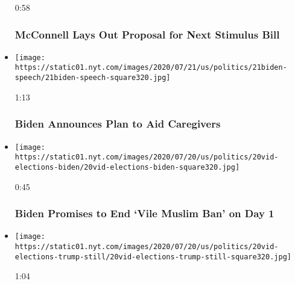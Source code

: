 \begin{itemize}
  0:58

  \hypertarget{mcconnell-lays-out-proposal-for-next-stimulus-bill}{%
  \subsubsection{McConnell Lays Out Proposal for Next Stimulus
  Bill}\label{mcconnell-lays-out-proposal-for-next-stimulus-bill}}
\item
  \href{https://www.nytimes.com/video/us/100000007249436/biden-announces-plan-to-aid-caregivers.html?action=click\&module=video-series-bar\&region=header\&pgtype=Article\&playlistId=video/us-politics}{}

  \texttt{[image: https://static01.nyt.com/images/2020/07/21/us/politics/21biden-speech/21biden-speech-square320.jpg]}

  1:13

  \hypertarget{biden-announces-plan-to-aid-caregivers}{%
  \subsubsection{Biden Announces Plan to Aid
  Caregivers}\label{biden-announces-plan-to-aid-caregivers}}
\item
  \href{https://www.nytimes.com/video/us/100000007248132/biden-muslim-voters.html?action=click\&module=video-series-bar\&region=header\&pgtype=Article\&playlistId=video/us-politics}{}

  \texttt{[image: https://static01.nyt.com/images/2020/07/20/us/politics/20vid-elections-biden/20vid-elections-biden-square320.jpg]}

  0:45

  \hypertarget{biden-promises-to-end-vile-muslim-ban-on-day-1}{%
  \subsubsection{Biden Promises to End `Vile Muslim Ban' on Day
  1}\label{biden-promises-to-end-vile-muslim-ban-on-day-1}}
\item
  \href{https://www.nytimes.com/video/us/100000007247868/trump-deploy-federal-agents.html?action=click\&module=video-series-bar\&region=header\&pgtype=Article\&playlistId=video/us-politics}{}

  \texttt{[image: https://static01.nyt.com/images/2020/07/20/us/politics/20vid-elections-trump-still/20vid-elections-trump-still-square320.jpg]}

  1:04

  \hypertarget{trump-plans-to-deploy-more-law-enforcement-officers-amid-protests}{%
}
\end{itemize}
